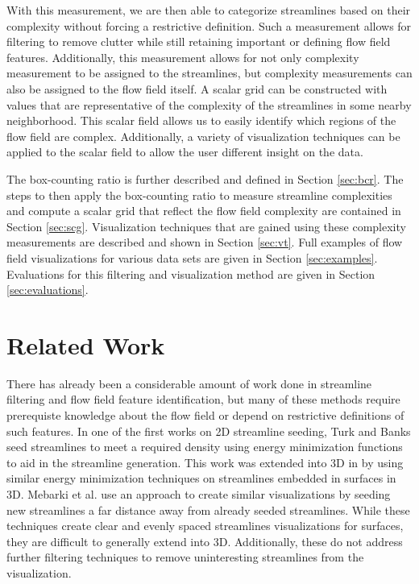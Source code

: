 \documentclass[journal]{vgtc}                %
\begin{document}
With this measurement, we are then able to categorize streamlines based on their complexity without forcing a restrictive definition.
Such a measurement allows for filtering to remove clutter while still retaining important or defining flow field features.
Additionally, this measurement allows for not only complexity measurement to be assigned to the streamlines, but complexity measurements can also be assigned to the flow field itself.
A scalar grid can be constructed with values that are representative of the complexity of the streamlines in some nearby neighborhood.
This scalar field allows us to easily identify which regions of the flow field are complex.
Additionally, a variety of visualization techniques can be applied to the scalar field to allow the user different insight on the data.

The box-counting ratio is further described and defined in Section \ref{sec:bcr}.
The steps to then apply the box-counting ratio to measure streamline complexities and compute a scalar grid that reflect the flow field complexity are contained in Section \ref{sec:scg}.
Visualization techniques that are gained using these complexity measurements are described and shown in Section \ref{sec:vt}.
Full examples of flow field visualizations for various data sets are given in Section \ref{sec:examples}.
Evaluations for this filtering and visualization method are given in Section \ref{sec:evaluations}.

\section{Related Work}

There has already been a considerable amount of work done in streamline filtering and flow field feature identification, but many of these methods require prerequiste knowledge about the flow field or depend on restrictive definitions of such features.
In one of the first works on 2D streamline seeding, Turk and Banks \cite{turk} seed streamlines to meet a required density using energy minimization functions to aid in the streamline generation.
This work was extended into 3D in \cite{mao} by using similar energy minimization techniques on streamlines embedded in surfaces in 3D.
Mebarki et al. \cite{mebarki} use an approach to create similar visualizations by seeding new streamlines a far distance away from already seeded streamlines.
While these techniques create clear and evenly spaced streamlines visualizations for surfaces, they are difficult to generally extend into 3D.
Additionally, these do not address further filtering techniques to remove uninteresting streamlines from the visualization.
\end{document}
